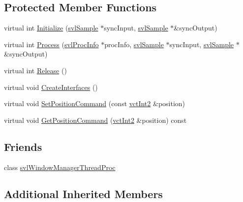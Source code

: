 \subsection*{Protected Member Functions}
\begin{DoxyCompactItemize}
\item 
virtual int \hyperlink{classsvl_filter_image_window_qt_stereo_af3a3a3bd31562988f7bb953a72531ca6}{Initialize} (\hyperlink{classsvl_sample}{svl\-Sample} $\ast$sync\-Input, \hyperlink{classsvl_sample}{svl\-Sample} $\ast$\&sync\-Output)
\item 
virtual int \hyperlink{classsvl_filter_image_window_qt_stereo_a93782fedb52934246f2bb28c7defb227}{Process} (\hyperlink{structsvl_proc_info}{svl\-Proc\-Info} $\ast$proc\-Info, \hyperlink{classsvl_sample}{svl\-Sample} $\ast$sync\-Input, \hyperlink{classsvl_sample}{svl\-Sample} $\ast$\&sync\-Output)
\item 
virtual int \hyperlink{classsvl_filter_image_window_qt_stereo_a18fe9065ef80165c03fd85910e576e4a}{Release} ()
\item 
virtual void \hyperlink{classsvl_filter_image_window_qt_stereo_a528723af991d95927d78432f6f1c1e56}{Create\-Interfaces} ()
\item 
virtual void \hyperlink{classsvl_filter_image_window_qt_stereo_ab8fe8f26e577b0f4604c9516cf2c0c12}{Set\-Position\-Command} (const \hyperlink{vct_fixed_size_vector_types_8h_add8c88eb6a432b15f14b866b9c35325f}{vct\-Int2} \&position)
\item 
virtual void \hyperlink{classsvl_filter_image_window_qt_stereo_ab1d89794b7070202b92d407c9f6a183b}{Get\-Position\-Command} (\hyperlink{vct_fixed_size_vector_types_8h_add8c88eb6a432b15f14b866b9c35325f}{vct\-Int2} \&position) const 
\end{DoxyCompactItemize}
\subsection*{Friends}
\begin{DoxyCompactItemize}
\item 
class \hyperlink{classsvl_filter_image_window_qt_stereo_a3da031c59e20922361dc2f6421a036db}{svl\-Window\-Manager\-Thread\-Proc}
\end{DoxyCompactItemize}
\subsection*{Additional Inherited Members}


